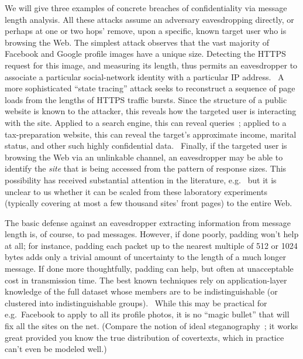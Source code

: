 \documentclass{zarticle}
\begin{document}
We will give three examples of concrete breaches of confidentiality
via message length analysis.  All these attacks assume an adversary
eavesdropping directly, or perhaps at one or two hops' remove, upon a
specific, known target user who is browsing the Web.  The simplest
attack observes that the vast majority of Facebook and Google profile
images have a unique size.  Detecting the HTTPS request for this
image, and measuring its length, thus permits an eavesdropper to
associate a particular social-network identity with a particular IP
address.~\cite{herrmann2012analyzing, pironti2012identifying} A more
sophisticated “state tracing” attack seeks to reconstruct a sequence
of page loads from the lengths of HTTPS traffic bursts.  Since the
structure of a public website is known to the attacker, this reveals
how the targeted user is interacting with the site.  Applied to a
search engine, this can reveal queries~\cite{castelluccia2010private};
applied to a tax-preparation website, this can reveal the target's
approximate income, marital status, and other such highly confidential
data.~\cite{zhang2010sidebuster} Finally, if the targeted user is
browsing the Web via an unlinkable channel, an eavesdropper may be
able to identify the \emph{site} that is being accessed from the
pattern of response sizes.  This possibility has received substantial
attention in the literature, e.g.~\cite{cai2012touching,
  cheng1998traffic, coull2007web, dyer2012peekaboo} but it is unclear
to us whether it can be scaled from these laboratory experiments
(typically covering at most a few thousand sites' front pages) to the
entire Web.

The basic defense against an eavesdropper extracting information from
message length is, of course, to pad messages.  However, if done
poorly, padding won't help at all; for instance, padding each packet
up to the nearest multiple of 512 or 1024 bytes adds only a trivial
amount of uncertainty to the length of a much longer message.  If done
more thoughtfully, padding can help, but often at unacceptable cost in
transmission time.  The best known techniques rely on
application-layer knowledge of the full dataset whose members are to
be indistinguishable (or clustered into indistinguishable
groups).~\cite{chen2010side, mather2012pinpointing,
  backes2013sidechannel} While this may be practical for
e.g.\ Facebook to apply to all its profile photos, it is no “magic
bullet” that will fix all the sites on the net.  (Compare the notion
of ideal steganography~\cite{hopper2009provably}; it works great
provided you know the true distribution of covertexts, which in
practice can't even be modeled well.)
\end{document}
